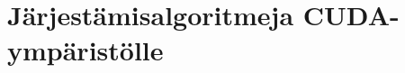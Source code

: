 \documentclass[a4paper,11pt]{article}
\begin{document}
\section{Järjestämisalgoritmeja CUDA-ympäristölle}


\printbibliography
\end{document}
